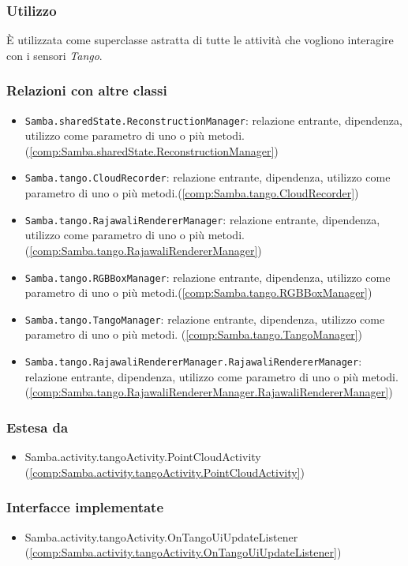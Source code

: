 \subsubsection{Utilizzo}
È utilizzata come superclasse astratta di tutte le attività che vogliono interagire con i sensori \emph{Tango}.
\subsubsection{Relazioni con altre classi}
\begin{itemize}
	\item \texttt{Samba.sharedState.ReconstructionManager}: relazione entrante, dipendenza, utilizzo come parametro di uno o più metodi. (\ref{comp:Samba.sharedState.ReconstructionManager})
	\item \texttt{Samba.tango.CloudRecorder}: relazione entrante, dipendenza, utilizzo come parametro di uno o più metodi.(\ref{comp:Samba.tango.CloudRecorder})
	\item \texttt{Samba.tango.RajawaliRendererManager}: relazione entrante, dipendenza, utilizzo come parametro di uno o più metodi.(\ref{comp:Samba.tango.RajawaliRendererManager})
	\item \texttt{Samba.tango.RGBBoxManager}: relazione entrante, dipendenza, utilizzo come parametro di uno o più metodi.(\ref{comp:Samba.tango.RGBBoxManager})
	\item \texttt{Samba.tango.TangoManager}: relazione entrante, dipendenza, utilizzo come parametro di uno o più metodi. (\ref{comp:Samba.tango.TangoManager})
	\item \texttt{Samba.tango.RajawaliRendererManager.RajawaliRendererManager}: relazione entrante, dipendenza, utilizzo come parametro di uno o più metodi. (\ref{comp:Samba.tango.RajawaliRendererManager.RajawaliRendererManager})
\end{itemize}
\subsubsection{Estesa da}
\begin{itemize}
	\item Samba.activity.tangoActivity.PointCloudActivity (\ref{comp:Samba.activity.tangoActivity.PointCloudActivity})
\end{itemize}
\subsubsection{Interfacce implementate}
\begin{itemize}
	\item Samba.activity.tangoActivity.OnTangoUiUpdateListener (\ref{comp:Samba.activity.tangoActivity.OnTangoUiUpdateListener})
\end{itemize}
